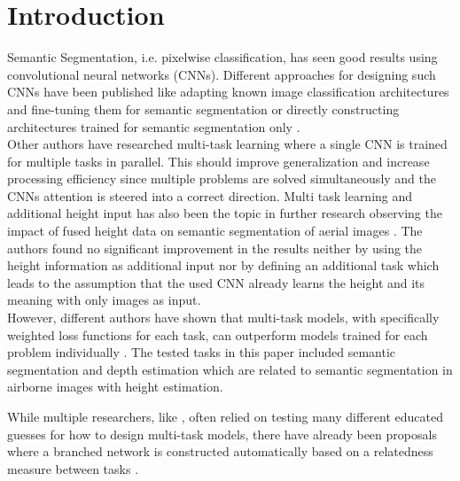 \section{Introduction}

Semantic Segmentation, i.e. pixelwise classification, has seen good results using convolutional neural networks
(CNNs). Different approaches for designing such CNNs have been published like adapting known image classification
architectures and fine-tuning them for semantic segmentation \parencite{2017-shelhamer-fully} or directly
constructing architectures trained for semantic segmentation only \parencite{2016-jegou-the}.\\

Other authors have researched multi-task learning \parencite{2018-kendall-multi} where a single CNN is trained
for multiple tasks in parallel. This should improve generalization and increase processing efficiency since multiple
problems are solved simultaneously and the CNNs attention is steered into a correct direction.
Multi task learning and additional height input has also been the topic in further research observing the impact
of fused height data on semantic segmentation of aerial images \parencite{2019-schmitz-semantic}. The authors found
no significant improvement in the results neither by using the height information as additional input nor by defining
an additional task which leads to the assumption that the used CNN already learns the height and its meaning with only
images as input. \\

However, different authors have shown that multi-task models, with specifically weighted loss functions for each task,
can outperform models trained for each problem individually \parencite{2018-kendall-multi}. The tested tasks in this 
paper included semantic segmentation and depth estimation which are related to semantic segmentation in airborne
images with height estimation.

While multiple researchers, like \textcite{2019-schmitz-semantic}, often relied on testing many different educated 
guesses for
how to design multi-task models, there have already been proposals where a branched network
is constructed automatically based on a relatedness measure between tasks \parencite{2019-vandenhende-branched}.\\

